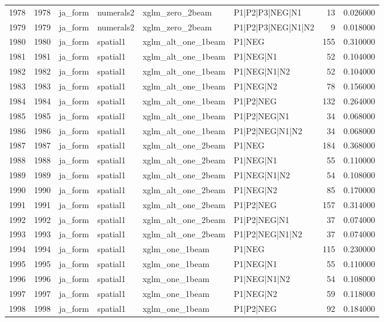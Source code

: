 \begin{tabular}{lrllllrr}
1978 & 1978 & ja_form & numerals2 & xglm_zero_2beam & P1|P2|P3|NEG|N1 & 13 & 0.026000 \\
1979 & 1979 & ja_form & numerals2 & xglm_zero_2beam & P1|P2|P3|NEG|N1|N2 & 9 & 0.018000 \\
1980 & 1980 & ja_form & spatial1 & xglm_alt_one_1beam & P1|NEG & 155 & 0.310000 \\
1981 & 1981 & ja_form & spatial1 & xglm_alt_one_1beam & P1|NEG|N1 & 52 & 0.104000 \\
1982 & 1982 & ja_form & spatial1 & xglm_alt_one_1beam & P1|NEG|N1|N2 & 52 & 0.104000 \\
1983 & 1983 & ja_form & spatial1 & xglm_alt_one_1beam & P1|NEG|N2 & 78 & 0.156000 \\
1984 & 1984 & ja_form & spatial1 & xglm_alt_one_1beam & P1|P2|NEG & 132 & 0.264000 \\
1985 & 1985 & ja_form & spatial1 & xglm_alt_one_1beam & P1|P2|NEG|N1 & 34 & 0.068000 \\
1986 & 1986 & ja_form & spatial1 & xglm_alt_one_1beam & P1|P2|NEG|N1|N2 & 34 & 0.068000 \\
1987 & 1987 & ja_form & spatial1 & xglm_alt_one_2beam & P1|NEG & 184 & 0.368000 \\
1988 & 1988 & ja_form & spatial1 & xglm_alt_one_2beam & P1|NEG|N1 & 55 & 0.110000 \\
1989 & 1989 & ja_form & spatial1 & xglm_alt_one_2beam & P1|NEG|N1|N2 & 54 & 0.108000 \\
1990 & 1990 & ja_form & spatial1 & xglm_alt_one_2beam & P1|NEG|N2 & 85 & 0.170000 \\
1991 & 1991 & ja_form & spatial1 & xglm_alt_one_2beam & P1|P2|NEG & 157 & 0.314000 \\
1992 & 1992 & ja_form & spatial1 & xglm_alt_one_2beam & P1|P2|NEG|N1 & 37 & 0.074000 \\
1993 & 1993 & ja_form & spatial1 & xglm_alt_one_2beam & P1|P2|NEG|N1|N2 & 37 & 0.074000 \\
1994 & 1994 & ja_form & spatial1 & xglm_one_1beam & P1|NEG & 115 & 0.230000 \\
1995 & 1995 & ja_form & spatial1 & xglm_one_1beam & P1|NEG|N1 & 55 & 0.110000 \\
1996 & 1996 & ja_form & spatial1 & xglm_one_1beam & P1|NEG|N1|N2 & 54 & 0.108000 \\
1997 & 1997 & ja_form & spatial1 & xglm_one_1beam & P1|NEG|N2 & 59 & 0.118000 \\
1998 & 1998 & ja_form & spatial1 & xglm_one_1beam & P1|P2|NEG & 92 & 0.184000 \\

\end{tabular}
